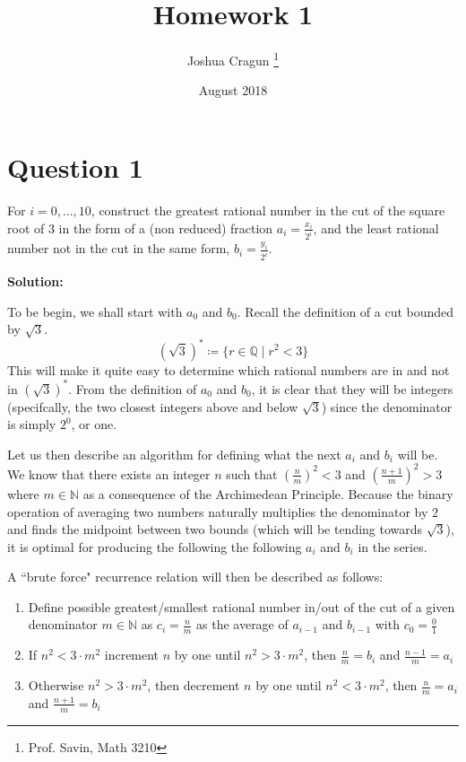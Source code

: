 \documentclass[12pt, letterpaper]{article}
\title{Homework 1}
\author{Joshua Cragun \thanks{Prof. Savin, Math 3210}}
\date{August 2018}
\begin{document}
\begin{titlepage}
\maketitle
\end{titlepage}

\section{Question 1}
For $i = 0, ..., 10$, construct the greatest rational number in the cut of the
square root of $3$ in the form of a (non reduced) fraction $a_i = \frac{x_i}{2^i}$,
and the least rational number not in the cut in the same form, $b_i = \frac{y_i}{2^i}$.

\noindent\textbf{Solution:}

To be begin, we shall start with $a_0$ and $b_0$. Recall the definition of a cut bounded by $\sqrt{3}$.
$$ (\sqrt{3})^{*} \coloneqq \{r \in \mathbb{Q} \mid r^2 < 3 \} $$
This will make it quite easy to determine which rational numbers are in and not
in $(\sqrt{3})^{*}$. From the definition of $a_0$ and $b_0$, it is clear that they will
be integers (specifcally, the two closest integers above and below $\sqrt{3}$) since the denominator is simply $2^0$, or one.

Let us then describe an algorithm for defining what the next $a_i$ and $b_i$ will be.
We know that there exists an integer $n$ such that $(\frac{n}{m})^2 < 3$ and $(\frac{n + 1}{m})^2 > 3$ where $m \in \mathbb{N}$ as a consequence of the Archimedean Principle.
Because the binary operation of averaging two numbers naturally multiplies the denominator by $2$ and finds the midpoint between
two bounds (which will be tending towards $\sqrt{3}$), it is optimal for producing the following the following $a_i$ and $b_i$ in the series.

A ``brute force" recurrence relation will then be described as follows:

\begin{enumerate}
  \item Define possible greatest/smallest rational number in/out of the cut of a given denominator $m \in \mathbb{N}$ as $c_i = \frac{n}{m}$ as the average of $a_{i-1}$ and $b_{i-1}$ with $c_0 = \frac{0}{1}$
  \item If $n^2 < 3 \cdot m^2$ increment $n$ by one until $n^2 > 3 \cdot m^2$, then $\frac{n}{m} = b_i$ and $\frac{n - 1}{m} = a_i$
  \item Otherwise $n^2 > 3 \cdot m^2$, then decrement $n$ by one until $n^2 < 3 \cdot m^2$, then $\frac{n}{m} = a_i$ and $\frac{n + 1}{m} = b_i$
\end{enumerate}
\end{document}
